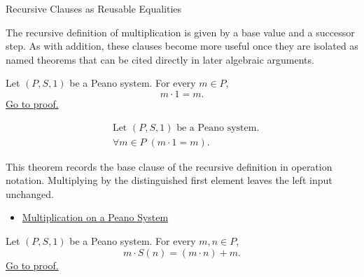 \begin{topicbox}{Recursive Clauses as Reusable Equalities}
\begin{exposition}
The recursive definition of multiplication is given by a base value and a
successor step. As with addition, these clauses become more useful once they
are isolated as named theorems that can be cited directly in later algebraic
arguments.
\end{exposition}

\begin{tcolorbox}[colback=thmbox, colframe=thmborder, arc=2pt,
  left=6pt, right=6pt, top=4pt, bottom=4pt,
  title={\small\textbf{Theorem (Multiplication With \texorpdfstring{$1$}{1})}},
  fonttitle=\small\bfseries]
\begin{theorem}
\label{thm:multiplication-with-one}
Let $(P,S,1)$ be a Peano system. For every $m \in P$,
\[
m \cdot 1 = m.
\]
\hyperref[prf:multiplication-with-one]{Go to proof.}
\end{theorem}
\end{tcolorbox}

\begin{remark*}
\[
\begin{aligned}
&\text{Let } (P,S,1) \text{ be a Peano system.}\\
&\forall m \in P\;(m \cdot 1 = m).
\end{aligned}
\]
\end{remark*}

\begin{remark*}[Interpretation]
This theorem records the base clause of the recursive definition in operation
notation. Multiplying by the distinguished first element leaves the left input
unchanged.
\end{remark*}

\begin{dependencies}
\begin{itemize}
  \item \hyperref[def:multiplication-on-peano-system]{Multiplication on a Peano System}
\end{itemize}
\end{dependencies}

\begin{tcolorbox}[colback=thmbox, colframe=thmborder, arc=2pt,
  left=6pt, right=6pt, top=4pt, bottom=4pt,
  title={\small\textbf{Theorem (Multiplication Successor on the Right)}},
  fonttitle=\small\bfseries]
\begin{theorem}
\label{thm:multiplication-successor-on-right}
Let $(P,S,1)$ be a Peano system. For every $m,n \in P$,
\[
m \cdot S(n) = (m \cdot n) + m.
\]
\hyperref[prf:multiplication-successor-on-right]{Go to proof.}
\end{theorem}
\end{tcolorbox}


\end{topicbox}
